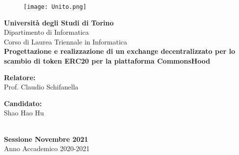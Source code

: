 \begin{titlepage} 
    \linespread{1}
    \begin{center} 
     \begin{figure}[t] 
      \centering\texttt{[image: Unito.png]} 
      \label{fig:logoUniTo} 
     \end{figure} 
     \LARGE\textbf{Università degli Studi di Torino} 
     \\ 
     \LARGE{Dipartimento di Informatica} 
     \\ 
     \LARGE{Corso di Laurea Triennale in Informatica} 
     \\ 
     \vspace{1.5cm} 
     \LARGE\textbf{Progettazione e realizzazione di un exchange decentralizzato per lo scambio di token ERC20 per la piattaforma CommonsHood} 
     \\ 
     \vspace*{1.5cm} 
     \begin{minipage}{6cm} 
      \begin{flushleft} 
       \large\textbf{Relatore:} 
       \\ 
       \large{Prof. Claudio Schifanella} 
      \end{flushleft} 
     \end{minipage} 
     \hfill 
     \begin{minipage}{6cm} 
      \begin{flushright} 
       \large\textbf{Candidato:} 
       \\ 
       \large{Shao Hao Hu} 
      \end{flushright} 
     \end{minipage} 
     \\ 
     \vspace*{\fill} 
     \large\textbf{Sessione Novembre 2021} 
     \\ 
     \large{Anno Accademico 2020-2021} 
    \end{center} 
\end{titlepage}
